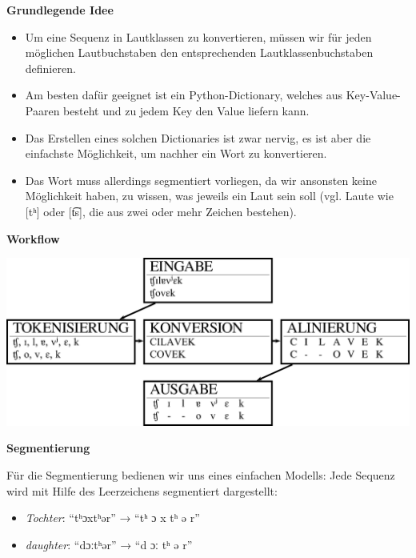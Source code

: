 \par\noindent\textbf{Grundlegende Idee}

\begin{itemize}
\itemsep1pt\parskip0pt
\item
  Um eine Sequenz in Lautklassen zu konvertieren, müssen wir für jeden
  möglichen Lautbuchstaben den entsprechenden Lautklassenbuchstaben
  definieren.
\item
  Am besten dafür geeignet ist ein Python-Dictionary, welches aus
  Key-Value-Paaren besteht und zu jedem Key den Value liefern kann.
\item
  Das Erstellen eines solchen Dictionaries ist zwar nervig, es ist aber
  die einfachste Möglichkeit, um nachher ein Wort zu konvertieren.
\item
  Das Wort muss allerdings segmentiert vorliegen, da wir ansonsten keine
  Möglichkeit haben, zu wissen, was jeweils ein Laut sein soll (vgl.
  Laute wie {[}tʰ{]} oder {[}t͡s{]}, die aus zwei oder mehr Zeichen
  bestehen).
\end{itemize}




\par\noindent\textbf{Workflow}

\includegraphics[width=\textwidth]{img/sca_workflow-4.png}


\par\noindent\textbf{Segmentierung}

Für die Segmentierung bedienen wir uns eines einfachen Modells: Jede
Sequenz wird mit Hilfe des Leerzeichens segmentiert dargestellt:

\begin{itemize}
\itemsep1pt\parskip0pt
\item
  \emph{Tochter}: ``tʰɔxtʰər'' → ``tʰ ɔ x tʰ ə r''
\item
  \emph{daughter}: ``dɔːtʰər'' → ``d ɔː tʰ ə r''
\end{itemize}

